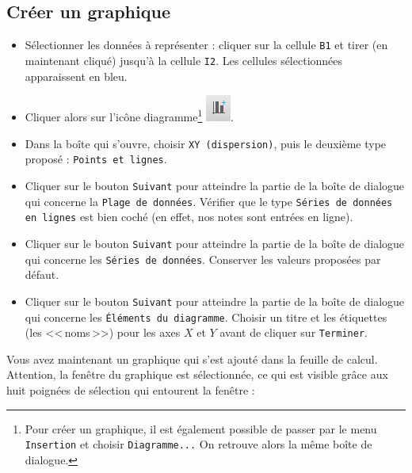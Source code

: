 \subsection{Créer un graphique}

\begin{itemize}
\item Sélectionner les données à représenter : cliquer sur la cellule \texttt{B1} et tirer (en maintenant cliqué) jusqu'à la cellule \texttt{I2}. Les cellules sélectionnées apparaissent en bleu.

\item Cliquer alors sur l'icône diagramme\footnote{Pour créer un graphique, il est également possible de passer par le menu \texttt{Insertion} et choisir \texttt{Diagramme...} On retrouve alors la même boîte de dialogue.} \includegraphics[scale=.6]{./images/tableur/iconeDiagramme}.
\item Dans la boîte qui s'ouvre, choisir \texttt{XY (dispersion)}, puis le deuxième type proposé : \texttt{Points et lignes}.
\item Cliquer sur le bouton \texttt{Suivant} pour atteindre la partie de la boîte de dialogue qui concerne la \texttt{Plage de données}. Vérifier que le type \texttt{Séries de données en lignes} est bien coché (en effet, nos notes sont entrées en ligne).
\item Cliquer sur le bouton \texttt{Suivant} pour atteindre la partie de la boîte de dialogue qui concerne les \texttt{Séries de données}. Conserver les valeurs proposées par défaut.
\item Cliquer sur le bouton \texttt{Suivant} pour atteindre la partie de la boîte de dialogue qui concerne les \texttt{Éléments du diagramme}. Choisir un titre et les étiquettes (les <<\,noms\,>>) pour les axes $X$ et $Y$ avant de cliquer sur \texttt{Terminer}.
\end{itemize}

Vous avez maintenant un graphique qui s'est ajouté dans la feuille de calcul. Attention, la fenêtre du graphique est sélectionnée, ce qui est visible grâce aux huit poignées de sélection qui entourent la fenêtre :

